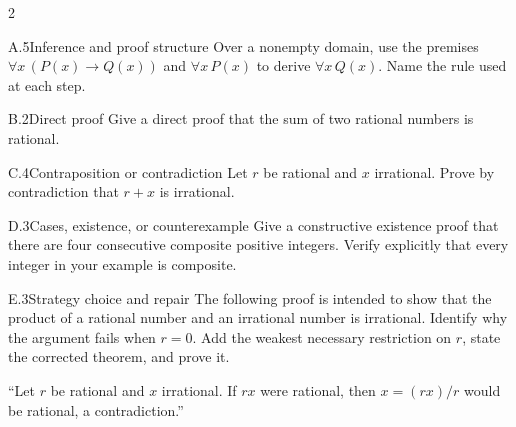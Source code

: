 \documentclass[9pt]{extarticle}
\begin{document}
\begin{multicols}{2}
\begin{CoreProblem}{A.5}{Inference and proof structure}
Over a nonempty domain, use the premises
$\forall x\,(P(x)\to Q(x))$ and $\forall x\,P(x)$ to derive
$\forall x\,Q(x)$. Name the rule used at each step.
\end{CoreProblem}
\begin{CoreProblem}{B.2}{Direct proof}
Give a direct proof that the sum of two rational numbers is rational.
\end{CoreProblem}
\begin{CoreProblem}{C.4}{Contraposition or contradiction}
Let $r$ be rational and $x$ irrational. Prove by contradiction that $r+x$ is irrational.
\end{CoreProblem}
\columnbreak
\begin{CoreProblem}{D.3}{Cases, existence, or counterexample}
Give a constructive existence proof that there are four consecutive composite
positive integers. Verify explicitly that every integer in your example is
composite.
\end{CoreProblem}
\begin{CoreProblem}{E.3}{Strategy choice and repair}
The following proof is intended to show that the product of a rational number
and an irrational number is irrational. Identify why the argument fails when
$r=0$. Add the weakest necessary restriction on $r$, state the corrected
theorem, and prove it.

``Let $r$ be rational and $x$ irrational. If $rx$ were rational, then $x=(rx)/r$ would be rational, a contradiction.''
\end{CoreProblem}
\end{multicols}
\CoreWorkArea
\FormBreak
{}
\end{document}
